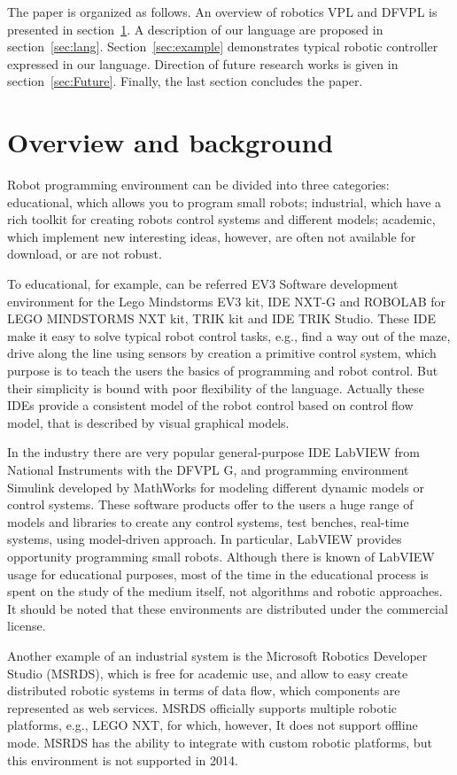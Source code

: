\documentclass[conference,compsoc]{IEEEtran}
\begin{document}
The paper is organized as follows. An overview of robotics VPL and DFVPL is presented in section~\ref{sec:Overview}. A description of our language are proposed in section~\ref{sec:lang}. Section~\ref{sec:example} demonstrates typical robotic controller expressed in our language. Direction of future research works is given in section~\ref{sec:Future}. Finally, the last section concludes the paper.


\section{Overview and background}
\label{sec:Overview}
Robot programming environment can be divided into three categories: educational, which allows you to program small robots; industrial, which have a rich toolkit for creating robots control systems and different models; academic, which implement new interesting ideas, however, are often not available for download, or are not robust.

To educational, for example, can be referred EV3 Software development environment for the Lego Mindstorms EV3 kit, IDE NXT-G and ROBOLAB for LEGO MINDSTORMS NXT kit, TRIK kit and IDE TRIK Studio. These IDE make it easy to solve typical robot control tasks, e.g., find a way out of the maze, drive along the line using sensors by creation a primitive control system, which purpose is to teach the users the basics of programming and robot control. But their simplicity is bound with poor flexibility of the language. Actually these IDEs provide a consistent model of the robot control based on control flow model, that is described by visual graphical models.

In the industry there are very popular general-purpose IDE LabVIEW from National Instruments with the DFVPL G, and programming environment Simulink developed by MathWorks for modeling different dynamic models or control systems. These software products offer to the users a huge range of models and libraries to create any control systems, test benches, real-time systems, using model-driven approach. In particular, LabVIEW provides opportunity programming small robots. Although there is known of LabVIEW usage for educational purposes\cite{1_gomez-de-gabriel_mandow_fernandez-lozano_garcia-cerezo_2011}, most of the time in the educational process is spent on the study of the medium itself, not algorithms and robotic approaches. It should be noted that these environments are distributed under the commercial license.

Another example of an industrial system is the Microsoft Robotics Developer Studio (MSRDS)\cite{jackson2007microsoft}, which is free for academic use, and allow to easy create distributed robotic systems in terms of data flow, which components are represented as web services. MSRDS officially supports multiple robotic platforms, e.g., LEGO NXT\cite{kim2007programming}, for which, however, It does not support offline mode. MSRDS has the ability to integrate with  custom robotic platforms, but this environment is not supported in 2014.
\end{document}
